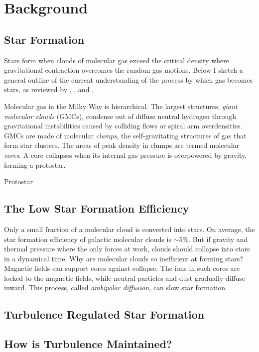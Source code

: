\section{Background}\label{sec:bkgrd}

\subsection{Star Formation}\label{sec:sf}
Stars form when clouds of molecular gas exceed the critical density where gravitational contraction overcomes the random gas motions. Below I sketch a general outline of the current understanding of the process by which gas becomes stars, as reviewed by \cite{McKee_2007}, \cite{Draine11}, and \cite{Dunham_2014}. 

Molecular gas in the Milky Way is hierarchical. The largest structures, \textit{giant molecular clouds} (GMCs), condense out of diffuse neutral hydrogen through gravitational instabilities caused by colliding flows or spiral arm overdensities. GMCs are made of molecular \textit{clumps}, the self-gravitating structures of gas that form star clusters. The areas of peak density in clumps are termed molecular \textit{cores}. A core collapses when its internal gas pressure is overpowered by gravity, forming a protostar.

Protostar

\subsection{The Low Star Formation Efficiency}\label{sec:sfe}
Only a small fraction of a molecular cloud is converted into stars. On average, the star formation efficiency of galactic molecular clouds is $\sim 5\%$. But if gravity and thermal pressure where the only forces at work, clouds should collapse into stars in a dynamical time. Why are molecular clouds so inefficient at forming stars? Magnetic fields can support cores against collapse. The ions in such cores are locked to the magnetic fields, while neutral particles and dust gradually diffuse inward. This process, called \textit{ambipolar diffusion}, can slow star formation.

\subsection{Turbulence Regulated Star Formation}\label{sec:turb}

\subsection{How is Turbulence Maintained?}\label{sec:turb-maint}

